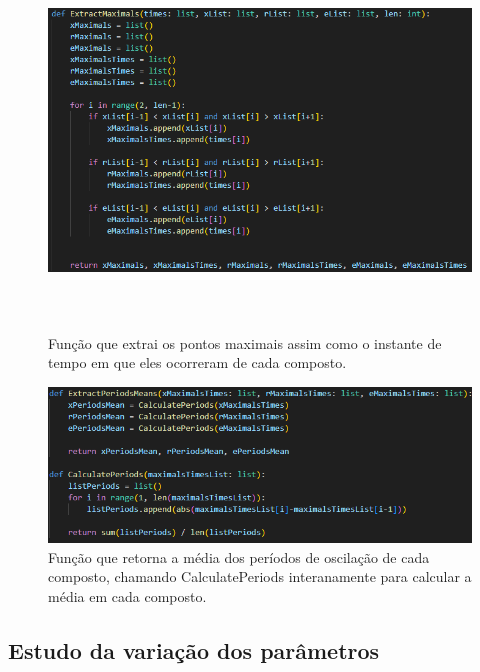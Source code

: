 \documentclass[brazilian,12pt,a4paper,final]{article}
\begin{document}
	\begin{figure}[hbtp]
		\begin{center}
			\includegraphics[height=10cm, width=14cm]{ExtractMaximals.png}
			\caption{Função que extrai os pontos maximais assim como o instante de tempo em que eles ocorreram de cada composto.}
			\label{fig}
		\end{center}
	\end{figure}
	
	\begin{figure}[hbtp]
		\begin{center}
			\includegraphics[]{ExtractPeriods.png}
			\caption{Função que retorna a média dos períodos de oscilação de cada composto, chamando CalculatePeriods interanamente para calcular a média em cada composto.}
			\label{fig}
		\end{center}
	\end{figure}
	
	\subsection{Estudo da variação dos parâmetros}
	
\end{document}

